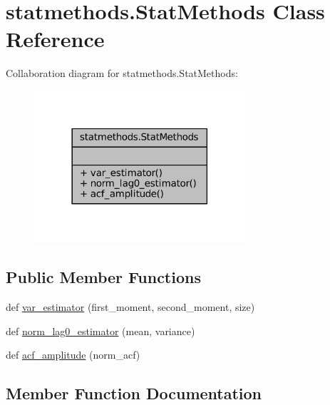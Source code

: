 \hypertarget{classstatmethods_1_1StatMethods}{}\section{statmethods.\+Stat\+Methods Class Reference}
\label{classstatmethods_1_1StatMethods}


Collaboration diagram for statmethods.\+Stat\+Methods\+:\nopagebreak
\begin{figure}[H]
\begin{center}
\leavevmode
\includegraphics[width=222pt]{dc/d64/classstatmethods_1_1StatMethods__coll__graph}
\end{center}
\end{figure}
\subsection*{Public Member Functions}
\begin{DoxyCompactItemize}
\item 
def \hyperlink{classstatmethods_1_1StatMethods_ae9dd94cc0586ae5ea83ac6cf4a81cb69}{var\+\_\+estimator} (first\+\_\+moment, second\+\_\+moment, size)
\item 
def \hyperlink{classstatmethods_1_1StatMethods_a98bde45d59d8558c9b675b9f5dbd0922}{norm\+\_\+lag0\+\_\+estimator} (mean, variance)
\item 
def \hyperlink{classstatmethods_1_1StatMethods_a7ceddee9254bdb4e664b4d798d67f870}{acf\+\_\+amplitude} (norm\+\_\+acf)
\end{DoxyCompactItemize}


\subsection{Member Function Documentation}
\mbox{\label{classstatmethods_1_1StatMethods_a7ceddee9254bdb4e664b4d798d67f870}} 
